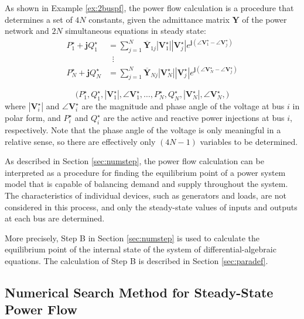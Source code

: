 \documentclass[graybox, envcountchap]{svmult}
\begin{document}
As shown in Example \ref{ex:2buspf}, the power flow calculation is a procedure
that determines a set of $4N$ constants, given the admittance matrix $\bm{Y}$ of
the power network and $2N$ simultaneous equations in steady state:
\begin{equation}\label{eq:PQVgenst}
  \begin{aligned}
    P_1^{\star} + \bm{j} Q_1^{\star} &= 
    \sum_{j=1}^{N} \overline{\bm{Y}}_{1j} |\bm{V}_1^{\star}| |\bm{V}_j^{\star} | e^{\bm{j} (\angle \bm{V}_1^{\star} - \angle \bm{V}_j^{\star} )} \\ 
    & \; \;  \vdots \\
    P_N^{\star} + \bm{j} Q_N^{\star} &= 
    \sum_{j=1}^{N} \overline{\bm{Y}}_{Nj} |\bm{V}_N^{\star}| |\bm{V}_j^{\star} | e^{\bm{j} (\angle \bm{V}_N^{\star} - \angle \bm{V}_j^{\star} )}
  \end{aligned}
\end{equation}

\begin{equation}\label{eq:pfconst}
  \bigl(
    P_1^{\star},Q_1^{\star},|\bm{V}_1^{\star}|,\angle \bm{V}_1^{\star},
    \ldots,
    P_N^{\star},Q_N^{\star},|\bm{V}_N^{\star}|,\angle \bm{V}_N^{\star},
  \bigr)
\end{equation}
where $|\bm{V}_i^{\star}|$ and $\angle \bm{V}_i^{\star}$ are the magnitude and
phase angle of the voltage at bus $i$ in polar form, and $P_i^{\star}$ and
$Q_i^{\star}$ are the active and reactive power injections at bus $i$,
respectively. Note that the phase angle of the voltage is only meaningful in a
relative sense, so there are effectively only $(4N-1)$ variables to be
determined.

As described in Section \ref{sec:numstep}, the power flow calculation can be
interpreted as a procedure for finding the equilibrium point of a power system
model that is capable of balancing demand and supply throughout the system. The
characteristics of individual devices, such as generators and loads, are not
considered in this process, and only the steady-state values of inputs and
outputs at each bus are determined.

More precisely, Step B in Section \ref{sec:numstep} is used to calculate the
equilibrium point of the internal state of the system of differential-algebraic
equations. The calculation of Step B is described in Section \ref{sec:paradef}.

\subsection{Numerical Search Method for Steady-State Power Flow}
\end{document}
